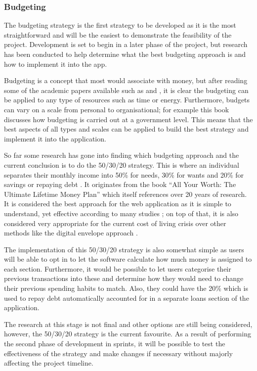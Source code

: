 \subsubsection{Budgeting}
The budgeting strategy is the first strategy to be developed as it is the most straightforward and will be the easiest to demonstrate the feasibility of the project. Development is set to begin in a later phase of the project, but research has been conducted to help determine what the best budgeting approach is and how to implement it into the app.

Budgeting is a concept that most would associate with money, but after reading some of the academic papers available such as \cite{hansen2003practice} and \cite{shim2011budgeting}, it is clear the budgeting can be applied to any type of resources such as time or energy. Furthermore, budgets can vary on a scale from personal to organisational; for example this book \cite{wildavsky1986budgeting} discusses how budgeting is carried out at a government level. This means that the best aspects of all types and scales can be applied to build the best strategy and implement it into the application.

So far some research has gone into finding which budgeting approach and the current conclusion is to do the 50/30/20 strategy. This is where an individual separates their monthly income into 50\% for needs, 30\% for wants and 20\% for savings or repaying debt \cite{503020Strategy}. It originates from the book ``All Your Worth: The Ultimate Lifetime Money Plan'' \cite{warren2005all} which itself references over 20 years of research. It is considered the best approach for the web application as it is simple to understand, yet effective according to many studies \cite{503020Examples}; on top of that, it is also considered very appropriate for the current cost of living crisis over other methods like the digital envelope approach \cite{503020InCostLivingCrisis}.

The implementation of this 50/30/20 strategy is also somewhat simple as users will be able to opt in to let the software calculate how much money is assigned to each section. Furthermore, it would be possible to let users categorise their previous transactions into these and determine how they would need to change their previous spending habits to match. Also, they could have the 20\% which is used to repay debt automatically accounted for in a separate loans section of the application.

The research at this stage is not final and other options are still being considered, however, the 50/30/20 strategy is the current favourite. As a result of performing the second phase of development in sprints, it will be possible to test the effectiveness of the strategy and make changes if necessary without majorly affecting the project timeline.

